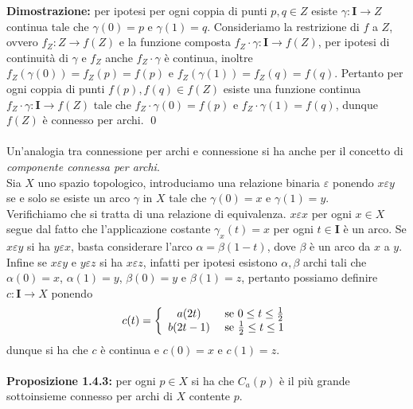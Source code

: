 \documentclass{article}
\begin{document}
\textbf{Dimostrazione:} per ipotesi per ogni coppia di punti $p, q \in Z$ esiste $\gamma : \mathbf{I} \longrightarrow Z$ continua tale che $\gamma(0) = p$ e $\gamma(1) = q$. Consideriamo la restrizione di $f$ a $Z$, ovvero $f_Z : Z \longrightarrow f(Z)$ e la funzione composta $f_Z \cdot \gamma : \mathbf{I} \longrightarrow f(Z)$, per ipotesi di continuità di $\gamma$ e $f_Z$ anche $f_Z \cdot \gamma$ è continua, inoltre $f_Z(\gamma(0)) = f_Z(p) = f(p)$ e $f_Z(\gamma(1)) = f_Z(q) = f(q)$. Pertanto per ogni coppia di punti $f(p), f(q) \in f(Z)$ esiste una funzione continua $f_Z \cdot \gamma : \mathbf{I} \longrightarrow f(Z)$ tale che $f_Z \cdot \gamma (0) = f(p)$ e $f_Z \cdot \gamma (1) = f(q)$, dunque $f(Z)$ è connesso per archi. \qed \\ \\
Un'analogia tra connessione per archi e connessione si ha anche per il concetto di \textit{componente connessa per archi}. \\
Sia $X$ uno spazio topologico, introduciamo una relazione binaria $\varepsilon$ ponendo $x \varepsilon y$ se e solo se esiste un arco $\gamma$ in $X$ tale che $\gamma(0) = x$ e $\gamma (1) = y$. \\
Verifichiamo che si tratta di una relazione di equivalenza. $x \varepsilon x$ per ogni $x \in X$ segue dal fatto che l'applicazione costante $\gamma_x(t) = x$ per ogni $t \in \mathbf{I}$ è un arco. Se $x \varepsilon y$ si ha $y \varepsilon x$, basta considerare l'arco $\alpha = \beta (1 - t)$, dove $\beta$ è un arco da $x$ a $y$. Infine se $x \varepsilon y$ e $y \varepsilon z$ si ha $x \varepsilon z$, infatti per ipotesi esistono $\alpha, \beta$ archi tali che $\alpha(0) = x$, $\alpha(1) = y$, $\beta(0) = y$ e $\beta(1) = z$, pertanto possiamo definire $c : \mathbf{I} \longrightarrow X$ ponendo
\begin{gather}
    c(t) = \left\{ \begin{array}{cc}
         a(2t)& \text{ se } 0 \leq t \leq \frac{1}{2}  \\
         b(2t - 1)& \text{ se } \frac{1}{2} \leq t \leq 1 \notag
    \end{array} \right.
\end{gather}
dunque si ha che $c$ è continua e $c(0) = x$ e $c(1) = z$.\\ \\
\textbf{Proposizione 1.4.3:} per ogni $p \in X$ si ha che $C_a(p)$ è il più grande sottoinsieme connesso per archi di $X$ contente $p$. \\
\end{document}
